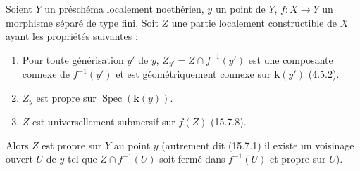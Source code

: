 \begin{proposition}[15.7.9]
\label{IV.15.7.9-fr}
Soient $Y$ un préschéma localement noethérien, $y$ un point de $Y$, $f:X\to Y$ un morphisme séparé de type fini. Soit $Z$ une partie localement constructible de $X$ ayant les propriétés suivantes :
\begin{enumerate}
  \item[\rm (i)] Pour toute générisation $y'$ de $y$, $Z_{y'}=Z\cap f^{-1}(y')$ est une composante connexe de $f^{-1}(y')$ et est géométriquement connexe sur $\boldsymbol{k}(y')$ \textup{(4.5.2)}.
  \item[\rm (ii)] $Z_y$ est propre sur $\operatorname{Spec}(\boldsymbol{k}(y))$.
  \item[\rm (iii)] $Z$ est universellement submersif sur $f(Z)$ \textup{(15.7.8)}.
\end{enumerate}

Alors $Z$ est propre sur $Y$ au point $y$ (autrement dit \textup{(15.7.1)} il existe un voisinage ouvert $U$ de $y$ tel que $Z\cap f^{-1}(U)$ soit fermé dans $f^{-1}(U)$ et propre sur $U$).
\end{proposition}

